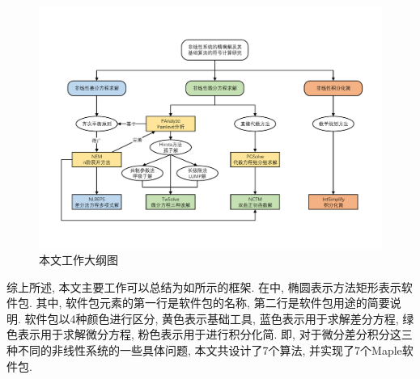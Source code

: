 \begin{figure}[htbp]
\includegraphics[width=\textwidth]{fig/outline.pdf}
\caption{本文工作大纲图}\label{outline}
\end{figure}

综上所述, 本文主要工作可以总结为如所示的框架. 在中, 椭圆表示方法\zdh 矩形表示软件包. 其中, 软件包元素的第一行是软件包的名称, 第二行是软件包用途的简要说明. 软件包以4种颜色进行区分, 黄色表示基础工具, 蓝色表示用于求解差分方程, 绿色表示用于求解微分方程, 粉色表示用于进行积分化简. 即, 对于微分\zdh 差分\zdh 积分这三种不同的非线性系统的一些具体问题, 本文共设计了7个算法, 并实现了7个Maple软件包.
